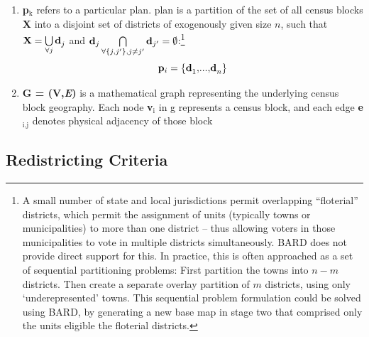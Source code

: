 \documentclass[article]{JSSstyle/jss}
\newcommand\textsubscript[1]{\ensuremath{{}_{\text{#1}}}}
\begin{document}
\begin{enumerate}
\item 
\textbf{p}\textit{\textsubscript{k}} refers to a particular plan. plan
is a partition of the set of all census blocks \textbf{X} into a disjoint set of districts of exogenously given size $n$, such that ${\bf X} = \bigcup\limits_{\forall j} {{\bf d}_j^{} }$ and ${\bf d}_j \bigcap\limits_{\forall \left\{ {j,j'} \right\},j \ne j'} {{\bf d}_{j'} }  = \emptyset$:\footnote{A small number of state and local jurisdictions permit 
overlapping ``floterial'' districts, which permit the assignment of units (typically towns or municipalities) to more than one district -- thus allowing voters in those municipalities to vote in multiple districts simultaneously.  BARD does not provide direct support for this. In practice, this is often approached as a set of sequential partitioning problems: First partition the towns into $n-m$ districts. Then create a separate overlay partition of $m$ districts, using only `underepresented' towns. This sequential problem formulation could be solved using BARD, by generating a new base map in stage two that comprised only the units eligible the floterial districts.}
\[
{\bf p}_i  = \left\{ {{\bf d}_1^{} {\rm ,}...{\rm ,}{\bf d}_n^{} } \right\}
\]
\item 
\textbf{G = (V,}\textbf{\textit{E}}\textbf{)} \textmd{is a mathematical
graph representing the underlying census block geography. Each} node
\textbf{v}\textit{\textsubscript{i}} in g represents a census block,
and each edge \textbf{e}\textit{\textsubscript{i,j}} denotes physical
adjacency of those block
\end{enumerate}

%
%

\subsection{Redistricting Criteria}
\end{document}
